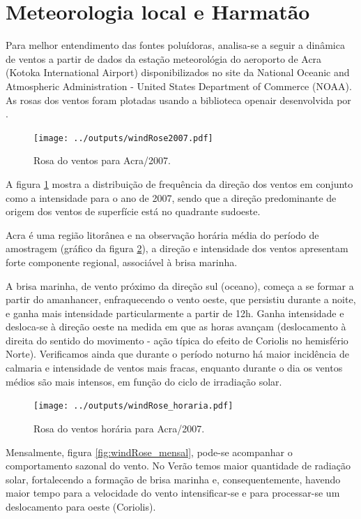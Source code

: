 \newpage
\section{Meteorologia local e Harmatão}

Para melhor entendimento das fontes poluídoras, analisa-se a seguir a 
dinâmica de ventos a partir de dados da estação meteorológia do 
aeroporto de Acra (Kotoka International Airport) disponibilizados no site da 
National Oceanic and Atmospheric Administration - United States Department of 
Commerce (NOAA). As rosas dos ventos foram plotadas usando a biblioteca 
openair desenvolvida por \citet{carslaw2012}.

\begin{figure}[H]
  \centering
  \texttt{[image: ../outputs/windRose2007.pdf]}
  \caption{Rosa do ventos para Acra/2007. \label{fg:rosaCompleta}}
\end{figure}

A figura \ref{fg:rosaCompleta} mostra a distribuição de frequência da direção 
dos ventos em conjunto como a intensidade para o ano de 2007, sendo que a direção 
predominante de origem dos ventos de superfície está no quadrante sudoeste.

Acra é uma região litorânea e na observação horária  média do período de 
amostragem (gráfico da figura \ref{fig:windRose_horaria}), a direção e intensidade dos ventos apresentam forte componente regional, 
associável à brisa marinha.

A brisa marinha, de vento próximo da direção sul (oceano), começa a se formar a 
partir do amanhancer, enfraquecendo o vento oeste, que persistiu durante a noite,
e ganha mais intensidade particularmente a partir de 12h. Ganha intensidade e 
desloca-se à direção oeste na medida em que as horas avançam 
(deslocamento à direita do sentido do movimento - ação típica do efeito de 
Coriolis no hemisfério Norte). 
Verificamos ainda que durante o período noturno há maior incidência de calmaria
e intensidade de ventos mais fracas, enquanto durante o dia os ventos médios são
mais intensos, em função do ciclo de irradiação solar.

\begin{figure}[H]
  \centering
  \texttt{[image: ../outputs/windRose\_horaria.pdf]}
  \caption{Rosa do ventos horária para Acra/2007. \label{fig:windRose_horaria}}
\end{figure}

Mensalmente, figura \ref{fig:windRose_mensal}, pode-se acompanhar o 
comportamento sazonal do vento. No Verão temos maior quantidade de radiação 
solar, fortalecendo a formação de brisa marinha e, consequentemente, havendo 
maior tempo para a velocidade do vento intensificar-se e para processar-se um 
deslocamento para oeste (Coriolis). 

